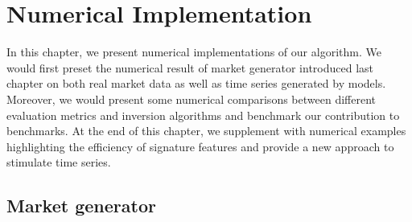 \documentclass[12pt]{report}
\theoremstyle{definition}
\theoremstyle{remark}
\begin{document}
\chapter{Numerical Implementation}
In this chapter, we present numerical implementations of our algorithm. We would first preset the numerical result of market generator introduced last chapter on both real market data as well as time series generated by models. Moreover, we would present some numerical comparisons between different evaluation metrics and inversion algorithms and benchmark our contribution to benchmarks. At the end of this chapter, we supplement with numerical examples highlighting the efficiency of signature features and provide a new approach to stimulate time series. 
\section{Market generator}
\end{document}
